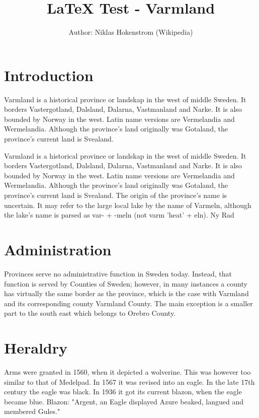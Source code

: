 \documentclass[a4paper, 11pt]{article}
\begin{document}
\title{\LaTeX{} Test - Varmland}
\author{Author: Niklas Hokenstrom (Wikipedia)}

\maketitle

\section{Introduction}

Varmland is a historical province or landskap in the west of middle Sweden. It borders Vastergotland, Dalsland, Dalarna, Vastmanland and Narke. It is also bounded by Norway in the west. Latin name versions are Vermelandia and Wermelandia. Although the province's land originally was Gotaland, the province's current land is Svealand.

Varmland is a historical province or landskap in the west of middle Sweden. It borders Vastergotland, Dalsland, Dalarna, Vastmanland and Narke. It is also bounded by Norway in the west. Latin name versions are Vermelandia and Wermelandia. Although the province's land originally was Gotaland, the province's current land is Svealand. The origin of the province's name is uncertain. It may refer to the large local lake by the name of Varmeln, although the lake's name is parsed as var- + -meln (not varm 'heat' + eln). Ny Rad

\section{Administration}
Provinces serve no administrative function in Sweden today. Instead, that function is served by Counties of Sweden; however, in many instances a county has virtually the same border as the province, which is the case with Varmland and its corresponding county Varmland County. The main exception is a smaller part to the south east which belongs to Orebro County.

\section{Heraldry}
Arms were granted in 1560, when it depicted a wolverine. This was however too similar to that of Medelpad. In 1567 it was revised into an eagle. In the late 17th century the eagle was black. In 1936 it got its current blazon, when the eagle became blue. Blazon: "Argent, an Eagle displayed Azure beaked, langued and membered Gules."
\end{document}
